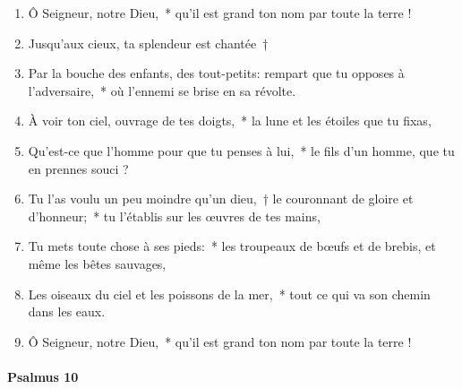 \documentclass[twoside]{article}
\begin{document}
\begin{paracol}[1]{2}

\begin{enumerate}[wide, itemsep=0mm, labelwidth=!, labelindent=0pt, label=\color{gregoriocolor}\theenumi]
\item Ô Seigneur, notre Dieu,~* qu'il est grand ton nom par toute la terre ! 
\item Jusqu'aux cieux, ta splendeur est chantée~†
\item Par la bouche des enfants, des tout-petits: rempart que tu opposes à l'adversaire,~* où l'ennemi se brise en sa révolte.
\item À voir ton ciel, ouvrage de tes doigts,~* la lune et les étoiles que tu fixas,
\item Qu'est-ce que l'homme pour que tu penses à lui,~* le fils d'un homme, que tu en prennes souci ?
\item Tu l'as voulu un peu moindre qu'un dieu,~† le couronnant de gloire et d'honneur;~* tu l'établis sur les œuvres de tes mains,
\item Tu mets toute chose à ses pieds:~* les troupeaux de bœufs et de brebis, et même les bêtes sauvages,
\item Les oiseaux du ciel et les poissons de la mer,~* tout ce qui va son chemin dans les eaux.
\item Ô Seigneur, notre Dieu,~* qu'il est grand ton nom par toute la terre !
\end{enumerate}
\pagebreak
\switchcolumn*
\paragraph{Psalmus 10}



\end{paracol}
\end{document}
